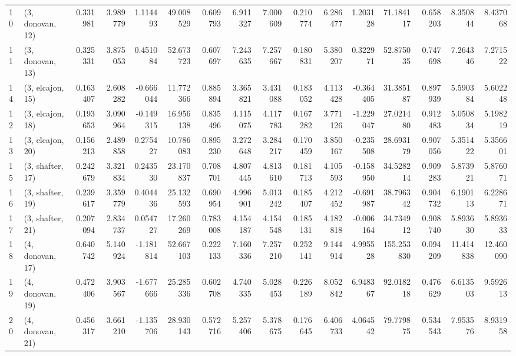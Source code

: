 \begin{tabular}{llrrrrrrrrrrrrrr}
10 &  (3, donovan, 12) &   0.331981 &  3.989779 &  1.114493 &  49.008529 &  0.609793 &   6.911327 &  7.000609 &  0.210774 &  6.286477 &  1.203128 &   71.184117 &  0.658203 &   8.350844 &   8.437068 \\
11 &  (3, donovan, 13) &   0.325331 &  3.875053 &  0.451084 &  52.673723 &  0.607697 &   7.243635 &  7.257667 &  0.180831 &  5.380207 &  0.322971 &   52.875035 &  0.747698 &   7.264346 &   7.271522 \\
14 &  (3, elcajon, 15) &   0.163407 &  2.608282 & -0.666044 &  11.772366 &  0.885894 &   3.365821 &  3.431088 &  0.183052 &  4.113428 & -0.364405 &   31.385187 &  0.897939 &   5.590384 &   5.602248 \\
12 &  (3, elcajon, 18) &   0.193653 &  3.090964 & -0.149315 &  16.956138 &  0.835496 &   4.115075 &  4.117783 &  0.167282 &  3.771126 & -1.229047 &   27.021480 &  0.912483 &   5.050834 &   5.198219 \\
13 &  (3, elcajon, 20) &   0.156213 &  2.489858 &  0.275427 &  10.786083 &  0.895230 &   3.272648 &  3.284217 &  0.170459 &  3.850167 & -0.235508 &   28.693179 &  0.907056 &   5.351422 &   5.356601 \\
15 &  (3, shafter, 17) &   0.242679 &  3.321834 &  0.243530 &  23.170837 &  0.708701 &   4.807445 &  4.813610 &  0.181713 &  4.105593 & -0.158950 &   34.528214 &  0.909283 &   5.873921 &   5.876071 \\
16 &  (3, shafter, 19) &   0.239617 &  3.359779 &  0.404436 &  25.132593 &  0.690954 &   4.996901 &  5.013242 &  0.185407 &  4.212452 & -0.691987 &   38.796342 &  0.904732 &   6.190113 &   6.228671 \\
17 &  (3, shafter, 21) &   0.207094 &  2.834737 &  0.054727 &  17.260269 &  0.783008 &   4.154187 &  4.154548 &  0.185131 &  4.182818 & -0.006164 &   34.734912 &  0.908740 &   5.893630 &   5.893633 \\
18 &  (4, donovan, 17) &   0.640742 &  5.140924 & -1.181814 &  52.667103 &  0.222133 &   7.160336 &  7.257210 &  0.252141 &  9.144914 &  4.995528 &  155.253830 &  0.094209 &  11.414838 &  12.460090 \\
19 &  (4, donovan, 19) &   0.472406 &  3.903567 & -1.677666 &  25.285336 &  0.602708 &   4.740335 &  5.028453 &  0.226189 &  8.052842 &  6.948367 &   92.018218 &  0.476629 &   6.613503 &   9.592613 \\
20 &  (4, donovan, 21) &   0.456317 &  3.661210 & -1.135706 &  28.930143 &  0.572716 &   5.257406 &  5.378675 &  0.176645 &  6.406733 &  4.064542 &   79.779875 &  0.534543 &   7.953576 &   8.931958 \\

\end{tabular}
